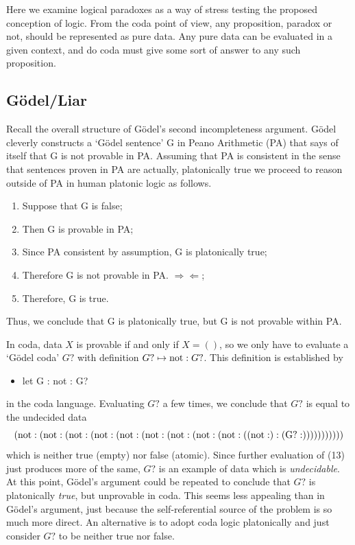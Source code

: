 \documentclass[11pt]{article}
\begin{document}
     Here we examine logical paradoxes as a way of stress testing the proposed conception of logic.  
From the coda point of view, any proposition, paradox or not, should be represented as pure data. 
Any pure data can be evaluated in a given context, and do coda must give some sort of answer 
to any such proposition. 

\subsection{G\"{o}del/Liar}

Recall the overall structure of G\"{o}del's second incompleteness argument.  G\"{o}del cleverly constructs a `G\"{o}del sentence' G  
in Peano Arithmetic (PA) that says of itself that G is not provable in PA.  Assuming that PA is consistent in the sense  
that sentences proven in PA are actually, platonically true we proceed to reason outside of PA in human platonic logic as follows. 
\begin{enumerate}
\item Suppose that G is false;
\item Then G is provable in PA;
\item Since PA consistent by assumption, G is platonically true; 
\item Therefore G is not provable in PA.  $\Rightarrow\!\Leftarrow$;
\item Therefore, G is true. 
\end{enumerate}
Thus, we conclude that G is platonically true, but G is not provable within PA.  

In coda, data $X$ is provable if and only if $X=()$, so we only have to evaluate a `G\"{o}del coda' $G?$ 
with definition $G?\mapsto {\rm not}:G?$.   This definition is established by 
\begin{itemize}
\item let G : not : G? 
\end{itemize}
in the coda language. 
Evaluating $G?$ a few times, we conclude that $G?$ is equal to the undecided data 
\begin{equation}\label{eqn} 
{\rm (not:(not:(not:(not:(not:(not:(not:(not:(not:(({not}:):({G?}:)))))))))))}
\end{equation} 
which is neither true (empty) nor false (atomic).  
Since further evaluation of (13) just produces more of the same, $G?$ is an example of data which is {\it undecidable}.   At this point, 
G\"{o}del's argument could be repeated to conclude that $G?$ is platonically {\it true}, but unprovable in coda.  This seems less 
appealing than in G\"odel's argument, just because the self-referential source of the problem is so much more direct.  An alternative 
is to adopt coda logic platonically and just consider $G?$ to be neither true nor false.   
\end{document}
